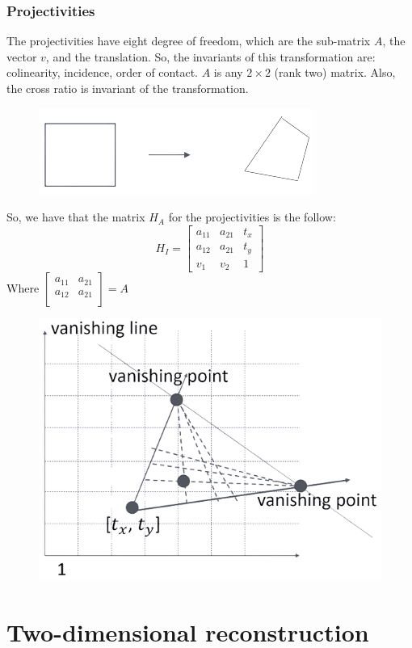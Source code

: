 \documentclass[12pt, a4paper]{report}
\begin{document}
    \subsection{Projectivities}
    The projectivities have eight degree of freedom, which are the sub-matrix $A$, the vector $v$, and the translation. So, the invariants of this transformation are: colinearity, incidence, order of contact.
    $A$ is any $2 \times 2$ (rank two) matrix. Also, the cross ratio is invariant of the transformation.
    \begin{figure}[H]
        \centering
        \includegraphics[width=0.5\linewidth]{images/projectivities.png}
    \end{figure}
    So, we have that the matrix $H_A$ for the projectivities is the follow: 
    \[H_I=
    \begin{bmatrix}
        a_{11} & a_{21} & t_x \\
        a_{12} & a_{21} & t_y \\
        v_1 & v_2 & 1
    \end{bmatrix}\]
    Where $
    \begin{bmatrix}
        a_{11} & a_{21} \\
        a_{12} & a_{21} \\
    \end{bmatrix}
    =A$
    \begin{figure}[H]
        \centering
        \includegraphics[width=0.5\linewidth]{images/projectivities1.png}
    \end{figure}

\newpage

\chapter{Two-dimensional reconstruction}
\end{document}
